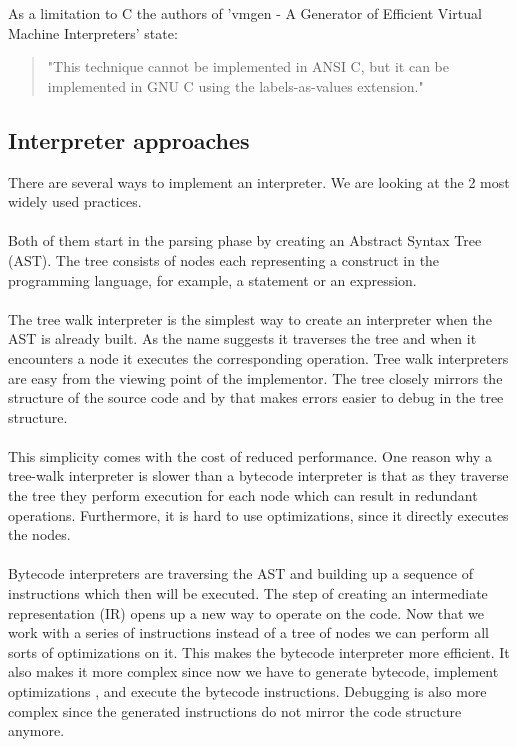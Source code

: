 \documentclass{article}
\begin{document}
As a limitation to C the authors of 'vmgen - A Generator of Efficient Virtual
Machine Interpreters' state:
\begin{quotation} 
"This technique cannot be implemented in ANSI C, but it can be implemented in
GNU C using the labels-as-values extension." ~\cite{vmgen} 
\end{quotation}

\subsection{Interpreter approaches}
There are several ways to implement an interpreter. We are looking
at the 2 most widely used practices. 
\\\\
Both of them start in the parsing phase by creating an Abstract Syntax
Tree (AST). The tree consists of nodes each representing a construct in
the programming language, for example, a statement or an expression. 
\\\\
The tree walk interpreter is the simplest way to create an interpreter when the
AST is already built. As the name suggests it traverses the tree and when it
encounters a node it executes the corresponding operation. Tree walk
interpreters are easy from the viewing point of the implementor. The tree
closely mirrors the structure of the source code and by that makes errors
easier to debug in the tree structure. ~\cite{bebic}
\\\\
This simplicity comes with the cost of reduced performance. One reason why a
tree-walk interpreter is slower than a bytecode interpreter is that as they
traverse the tree they perform execution for each node which can result in
redundant operations. Furthermore, it is hard to use optimizations, since
it directly executes the nodes. ~\cite{bebic}
\\\\
Bytecode interpreters are traversing the AST and building up a sequence of
instructions which then will be executed. The step of creating an intermediate
representation (IR) opens up a new way to operate on the code. Now that we work
with a series of instructions instead of a tree of nodes we can perform all
sorts of optimizations on it. This makes the bytecode interpreter more
efficient. It also makes it more complex since now we have to generate
bytecode, implement optimizations , and execute the bytecode instructions.
Debugging is also more complex since the generated instructions do not mirror
the code structure anymore. ~\cite{bebic}
\end{document}
